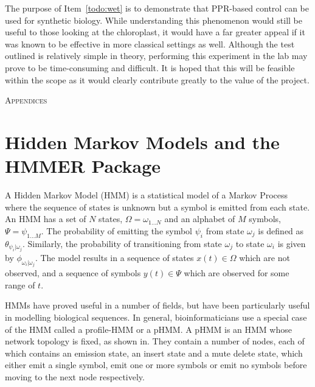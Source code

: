 \documentclass[twoside,a4paper]{article}
\begin{document}
\begin{multicols}{2}
The purpose of Item~\ref{todo:wet} is to demonstrate that PPR-based control can
be used for synthetic biology.
While understanding this phenomenon would still be useful to those looking at
the chloroplast, it would have a far greater appeal if it was known to be
effective in more classical settings as well.
Although the test outlined is relatively simple in theory, performing this
experiment in the lab may prove to be time-consuming and difficult.
It is hoped that this will be feasible within the scope as it would clearly
contribute greatly to the value of the project.


\begin{center}
  \large\textsc{Appendices}
\end{center}

\appendix

\section{Hidden Markov Models and the HMMER Package}
\label{sec:HMMs}

A Hidden Markov Model (HMM) is a statistical model of a Markov Process where
the sequence of states is unknown but a symbol is emitted from each state. 
An HMM has a set of $N$ states, 
$\Omega = \omega_{1 \ldots N}$ and an alphabet of $M$ symbols, 
$\Psi = \psi_{1 \ldots M}$. 
The probability of emitting the symbol $\psi_i$ from state $\omega_j$ is 
defined as $\theta_{\psi_i | \omega_j}$.
Similarly, the probability of transitioning from state $\omega_j$ to state
$\omega_i$ is given by $\phi_{\omega_i | \omega_j}$.
The model results in a sequence of states $x(t) \in \Omega$ which are not
observed, and a sequence of symbols $y(t) \in \Psi$ which are observed for some
range of $t$.

HMMs have proved useful in a number of fields, but have been particularly
useful in modelling biological sequences. 
In general, bioinformaticians use a special case of the HMM called a
profile-HMM or a pHMM.
A pHMM is an HMM whose network topology is fixed, as shown in.
They contain a number of nodes, each of which contains an emission state, an
insert state and a mute delete state, which either emit a single symbol, emit
one or more symbols or emit no symbols before moving to the next node
respectively.


\end{multicols}
\end{document}
